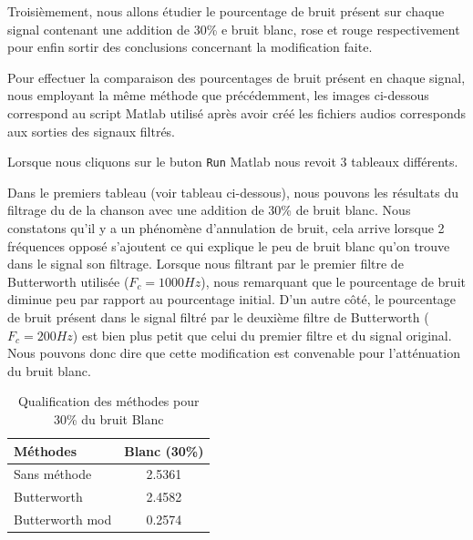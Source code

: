 \documentclass[conference,onecolumn]{IEEEtran}
\begin{document}
Troisièmement, nous allons étudier le pourcentage de bruit présent sur chaque signal contenant une addition de 30\% e bruit blanc, rose et rouge respectivement pour enfin sortir des conclusions concernant la modification faite. 

Pour effectuer la comparaison des pourcentages de bruit présent en chaque signal, nous employant la même méthode que précédemment, les images ci-dessous correspond au script Matlab utilisé après avoir créé les fichiers audios corresponds aux sorties des signaux filtrés. 



Lorsque nous cliquons sur le buton \texttt{Run} Matlab nous revoit 3 tableaux différents. 

Dans le premiers tableau (voir tableau ci-dessous), nous pouvons les résultats du filtrage du de la chanson avec une addition de 30\% de bruit blanc. Nous constatons qu'il y a un phénomène d'annulation de bruit, cela arrive lorsque 2 fréquences opposé s'ajoutent ce qui explique le peu de bruit blanc qu'on trouve dans le signal son filtrage. Lorsque nous filtrant par le premier filtre de Butterworth utilisée ($F_c = 1000 Hz$), nous remarquant que le pourcentage de bruit diminue peu par rapport au pourcentage initial. D'un autre côté, le pourcentage de bruit présent dans le signal filtré par le deuxième filtre de Butterworth ($F_c = 200 Hz$) est bien plus petit que celui du premier filtre et du signal original. Nous pouvons donc dire que cette modification est convenable pour l'atténuation du bruit blanc.

\begin{table}[hbt!]
    \centering
    \begin{tabular}{ l  c }
    \textbf{Méthodes} & \textbf{Blanc (30\%)} \\
    \hline
    Sans méthode &  2.5361\\
    Butterworth &  2.4582\\
    Butterworth mod &  0.2574\\
    \end{tabular}
    \caption{Qualification des méthodes pour 30\% du bruit Blanc}
    \label{table:t7}
\end{table}
\end{document}
